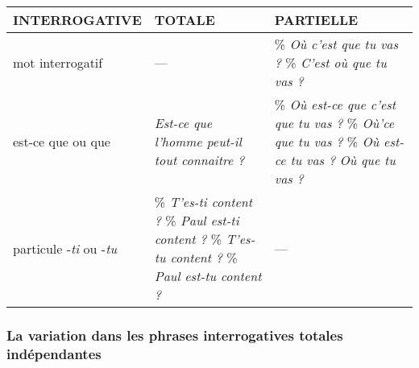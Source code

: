 \documentclass[UTF8]{report}
\begin{document}
\begin{table}[H]
    \centering
    \begin{tabular}{| L{3.5cm} | L{5.5cm} | L{5.5cm} |}
    \hline
    \textbf{INTERROGATIVE} & \textbf{TOTALE} & \textbf{PARTIELLE} \\
    \hline
    mot interrogatif & — & \% \textit{Où c'est que tu vas ?} \newline \% \textit{C'est où que tu vas ?} \\
    \hline
    est-ce que ou que & \! \textit{Est-ce que l'homme peut-il tout connaitre ?} & \% \textit{Où est-ce que c'est que tu vas ?} \newline \% \textit{Où'ce que tu vas ?} \newline \% \textit{Où est-ce tu vas ?} \newline \! \textit{Où que tu vas ?} \\
    \hline
    particule -\textit{ti} ou -\textit{tu} & \% \textit{T'es-ti content ?} \newline \% \textit{Paul est-ti content ?} \newline \% \textit{T'es-tu content ?} \newline \% \textit{Paul est-tu content ?} & — \\
    \hline
    \end{tabular}
\end{table}

\subsubsection{La variation dans les phrases interrogatives totales indépendantes}
\end{document}
